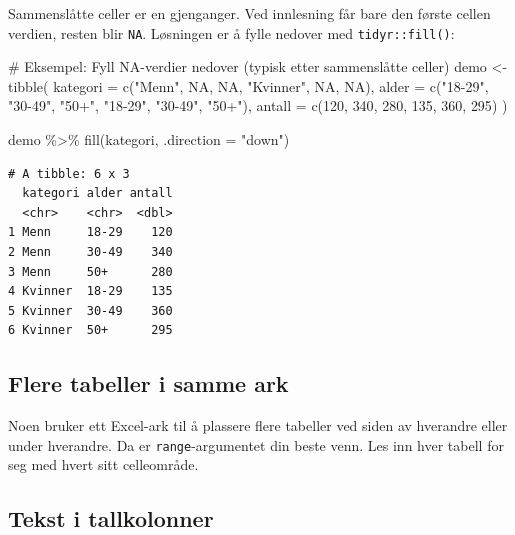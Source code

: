 \documentclass[
  norsk,
  letterpaper,
  DIV=11,
  numbers=noendperiod]{scrreprt}
\newenvironment{Shaded}{\begin{snugshade}}{\end{snugshade}}
\newcommand{\AttributeTok}[1]{\textcolor[rgb]{0.40,0.45,0.13}{#1}}
\newcommand{\CommentTok}[1]{\textcolor[rgb]{0.37,0.37,0.37}{#1}}
\newcommand{\ConstantTok}[1]{\textcolor[rgb]{0.56,0.35,0.01}{#1}}
\newcommand{\DecValTok}[1]{\textcolor[rgb]{0.68,0.00,0.00}{#1}}
\newcommand{\FunctionTok}[1]{\textcolor[rgb]{0.28,0.35,0.67}{#1}}
\newcommand{\NormalTok}[1]{\textcolor[rgb]{0.00,0.23,0.31}{#1}}
\newcommand{\OtherTok}[1]{\textcolor[rgb]{0.00,0.23,0.31}{#1}}
\newcommand{\SpecialCharTok}[1]{\textcolor[rgb]{0.37,0.37,0.37}{#1}}
\newcommand{\StringTok}[1]{\textcolor[rgb]{0.13,0.47,0.30}{#1}}
\theoremstyle{definition}
\theoremstyle{remark}
\begin{document}
Sammenslåtte celler er en gjenganger. Ved innlesning får bare den første
cellen verdien, resten blir \texttt{NA}. Løsningen er å fylle nedover
med \texttt{tidyr::fill()}:

\begin{Shaded}
\begin{Highlighting}[]
\CommentTok{\# Eksempel: Fyll NA{-}verdier nedover (typisk etter sammenslåtte celler)}
\NormalTok{demo }\OtherTok{\textless{}{-}} \FunctionTok{tibble}\NormalTok{(}
  \AttributeTok{kategori =} \FunctionTok{c}\NormalTok{(}\StringTok{"Menn"}\NormalTok{, }\ConstantTok{NA}\NormalTok{, }\ConstantTok{NA}\NormalTok{, }\StringTok{"Kvinner"}\NormalTok{, }\ConstantTok{NA}\NormalTok{, }\ConstantTok{NA}\NormalTok{),}
  \AttributeTok{alder =} \FunctionTok{c}\NormalTok{(}\StringTok{"18{-}29"}\NormalTok{, }\StringTok{"30{-}49"}\NormalTok{, }\StringTok{"50+"}\NormalTok{, }\StringTok{"18{-}29"}\NormalTok{, }\StringTok{"30{-}49"}\NormalTok{, }\StringTok{"50+"}\NormalTok{),}
  \AttributeTok{antall =} \FunctionTok{c}\NormalTok{(}\DecValTok{120}\NormalTok{, }\DecValTok{340}\NormalTok{, }\DecValTok{280}\NormalTok{, }\DecValTok{135}\NormalTok{, }\DecValTok{360}\NormalTok{, }\DecValTok{295}\NormalTok{)}
\NormalTok{)}

\NormalTok{demo }\SpecialCharTok{\%\textgreater{}\%}
  \FunctionTok{fill}\NormalTok{(kategori, }\AttributeTok{.direction =} \StringTok{"down"}\NormalTok{)}
\end{Highlighting}
\end{Shaded}

\begin{verbatim}
# A tibble: 6 x 3
  kategori alder antall
  <chr>    <chr>  <dbl>
1 Menn     18-29    120
2 Menn     30-49    340
3 Menn     50+      280
4 Kvinner  18-29    135
5 Kvinner  30-49    360
6 Kvinner  50+      295
\end{verbatim}

\subsection{Flere tabeller i samme
ark}\label{flere-tabeller-i-samme-ark}

Noen bruker ett Excel-ark til å plassere flere tabeller ved siden av
hverandre eller under hverandre. Da er \texttt{range}-argumentet din
beste venn. Les inn hver tabell for seg med hvert sitt celleområde.

\subsection{Tekst i tallkolonner}\label{tekst-i-tallkolonner}
\end{document}
